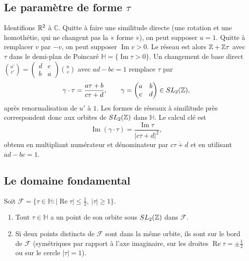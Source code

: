 \subsection{Le paramètre de forme \texorpdfstring{$\tau$}{tau}}
Identifions $\mathbb{R}^2$ à $\mathbb{C}$. Quitte à faire une similitude directe (une rotation et une homothétie, qui ne changent pas la
« forme »), on peut supposer $u=1$. Quitte à remplacer $v$ par $-v$, on peut supposer $\operatorname{Im}v>0$. Le réseau
est alors $\mathbb{Z}+\mathbb{Z}\tau$ avec $\tau$ dans le demi-plan de Poincaré $\mathbb H=\{\operatorname{Im}\tau>0\}$. Un changement
de base direct $\binom{u'}{v'}=\begin{pmatrix}d&c\\b&a\end{pmatrix}\binom uv$ avec $ad-bc=1$ remplace $\tau$ par
\[\gamma\cdot\tau=\frac{a\tau+b}{c\tau+d},\qquad\gamma=\begin{pmatrix}a&b\\c&d\end{pmatrix}\in SL_2(\mathbb{Z}),\]
après renormalisation de $u'$ à $1$. Les formes de réseaux à similitude près correspondent donc aux orbites de
$SL_2(\mathbb{Z})$ dans $\mathbb H$. Le calcul clé est
\begin{equation}\label{appA:eq:im}
\operatorname{Im}(\gamma\cdot\tau)=\frac{\operatorname{Im}\tau}{|c\tau+d|^2},
\end{equation}
obtenu en multipliant numérateur et dénominateur par $\overline{c\tau+d}$ et en utilisant $ad-bc=1$.

\subsection{Le domaine fondamental}
\begin{theorem}\label{appA:thm:domaine}
Soit $\mathcal F=\{\tau\in\mathbb H:|\operatorname{Re}\tau|\le\tfrac12,\ |\tau|\ge1\}$.
\begin{enumerate}
\item Tout $\tau\in\mathbb H$ a un point de son orbite sous $SL_2(\mathbb{Z})$ dans $\mathcal F$.
\item Si deux points distincts de $\mathcal F$ sont dans la même orbite, ils sont sur le bord de $\mathcal F$
(symétriques par rapport à l'axe imaginaire, sur les droites $\operatorname{Re}\tau=\pm\frac12$ ou sur le cercle
$|\tau|=1$).
\end{enumerate}
\end{theorem}

